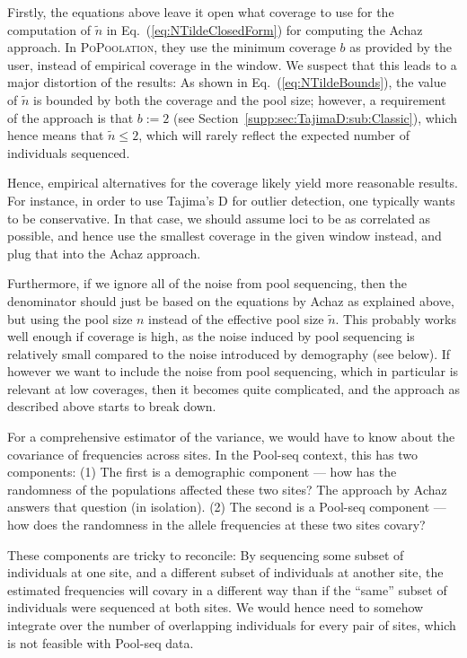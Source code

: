 \documentclass[letterpaper,fontsize=9pt,DIV=12]{scrartcl}
\newcommand\toolname{\textsc}
\newcommand\eqnref[1]{Eq.~(\ref{#1})}
\newcommand\secref[1]{Section~\ref{#1}}
\begin{document}
Firstly, the equations above leave it open what coverage to use for the computation of $\tilde{n}$ in \eqnref{eq:NTildeClosedForm} for computing the Achaz approach.  In \toolname{PoPoolation}, they use the minimum coverage $b$ as provided by the user, instead of empirical coverage in the window.  We suspect that this leads to a major distortion of the results:  As shown in \eqnref{eq:NTildeBounds}, the value of $\tilde{n}$ is bounded by both the coverage and the pool size; however, a requirement of the approach is that $b := 2$ (see \secref{supp:sec:TajimaD:sub:Classic}), which hence means that $\tilde{n} \leq 2$, which will rarely reflect the expected number of individuals sequenced.

Hence, empirical alternatives for the coverage likely yield more reasonable results. For instance, in order to use Tajima's D for outlier detection, one typically wants to be conservative. In that case, we should assume loci to be as correlated as possible, and hence use the smallest coverage in the given window instead, and plug that into the Achaz approach.

Furthermore, if we ignore all of the noise from pool sequencing, then the denominator should just be based on the equations by Achaz as explained above, but using the pool size $n$ instead of the effective pool size $\tilde{n}$.  This probably works well enough if coverage is high, as the noise induced by pool sequencing is relatively small compared to the noise introduced by demography (see below).  If however we want to include the noise from pool sequencing, which in particular is relevant at low coverages, then it becomes quite complicated, and the approach as described above starts to break down.

For a comprehensive estimator of the variance, we would have to know about the covariance of frequencies across sites. In the Pool-seq context, this has two components: (1) The first is a demographic component --- how has the randomness of the populations affected these two sites? The approach by Achaz answers that question (in isolation).  (2) The second is a Pool-seq component --- how does the randomness in the allele frequencies at these two sites covary?

These components are tricky to reconcile: By sequencing some subset of individuals at one site, and a different subset of individuals at another site, the estimated frequencies will covary in a different way than if the ``same'' subset of individuals were sequenced at both sites.  We would hence need to somehow integrate over the number of overlapping individuals for every pair of sites, which is not feasible with Pool-seq data.
\end{document}
